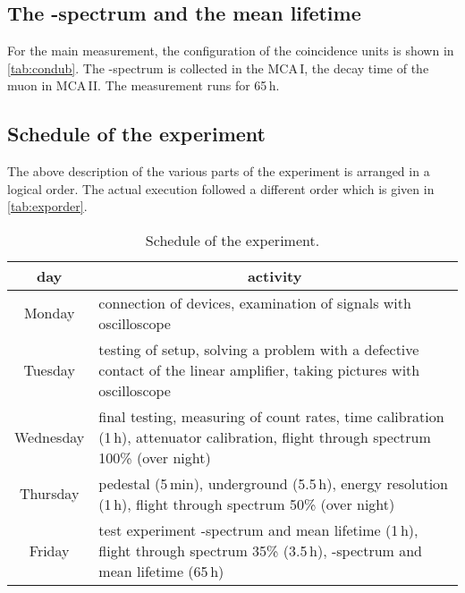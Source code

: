 \subsection{The \textbeta-spectrum and the mean lifetime}

For the main measurement, the configuration of the coincidence units is shown in \autoref{tab:condub}.
The \textbeta-spectrum is collected in the MCA\,I, the decay time of the muon in MCA\,II.
The measurement runs for 65\,h.


\subsection{Schedule of the experiment}
The above description of the various parts of the experiment is arranged in a logical order.
The actual execution followed a different order which is given in \autoref{tab:exporder}.

\begin{table}[H]
\caption{Schedule of the experiment.}
\begin{center}
\begin{tabular}{|c|p{12cm}|}
  \hline
  day				&  \multicolumn{1}{|c|}{activity} 		\\ \hline\hline
  Monday			& connection of devices, examination of signals with oscilloscope			\\ \hline
  Tuesday			& testing of setup, solving a problem with a defective contact of the linear amplifier, taking pictures with oscilloscope						\\ \hline
  Wednesday			& final testing, measuring of count rates, time calibration (1\,h), attenuator calibration, flight through spectrum 100\% (over night)				\\ \hline
  Thursday			& pedestal (5\,min), underground (5.5\,h), energy resolution (1\,h), flight through spectrum 50\% (over night)		\\ \hline
  Friday			& test experiment \textbeta-spectrum and mean lifetime (1\,h), flight through spectrum 35\% (3.5\,h), \textbeta-spectrum and mean lifetime (65\,h)			\\ \hline
 \end{tabular}
\end{center}
\label{tab:exporder}
\end{table}


